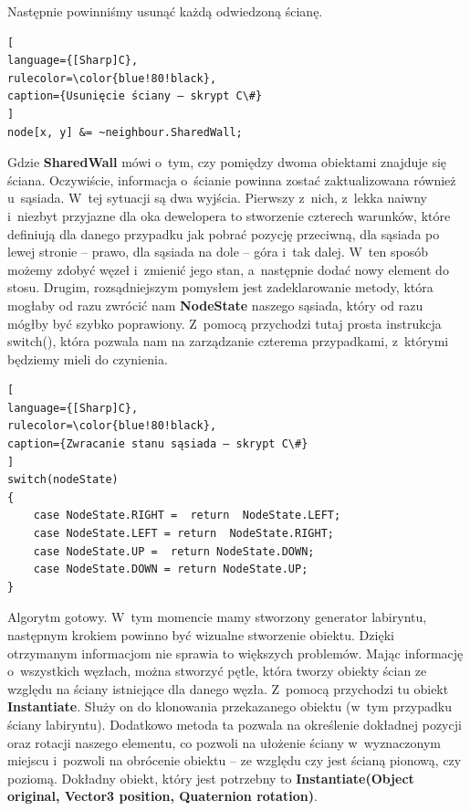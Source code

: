 \documentclass[oneside,polski,logo]{amuthesis}
\begin{document}
Następnie powinniśmy usunąć każdą odwiedzoną ścianę.

\begin{lstlisting}[
language={[Sharp]C},
rulecolor=\color{blue!80!black},
caption={Usunięcie ściany – skrypt C\#}
]
node[x, y] &= ~neighbour.SharedWall;
\end{lstlisting}

Gdzie \textbf{SharedWall} mówi o~tym, czy pomiędzy dwoma obiektami znajduje się ściana. Oczywiście, informacja o~ścianie powinna zostać zaktualizowana również u~sąsiada. W~tej sytuacji są dwa wyjścia. Pierwszy z~nich, z~lekka naiwny i~niezbyt przyjazne dla oka dewelopera to stworzenie czterech warunków, które definiują dla danego przypadku jak pobrać pozycję przeciwną, dla sąsiada po lewej stronie – prawo, dla sąsiada na dole – góra i~tak dalej. W~ten sposób możemy zdobyć węzeł i~zmienić jego stan, a~następnie dodać nowy element do stosu. Drugim, rozsądniejszym pomysłem jest zadeklarowanie metody, która mogłaby od razu zwrócić nam \textbf{NodeState} naszego sąsiada, który od razu mógłby być szybko poprawiony. Z~pomocą przychodzi tutaj prosta instrukcja switch(), która pozwala nam na zarządzanie czterema przypadkami, z~którymi będziemy mieli do czynienia.


\begin{lstlisting}[
language={[Sharp]C},
rulecolor=\color{blue!80!black},
caption={Zwracanie stanu sąsiada – skrypt C\#}
]
switch(nodeState)
{
	case NodeState.RIGHT =  return  NodeState.LEFT;
	case NodeState.LEFT = return  NodeState.RIGHT;
	case NodeState.UP =  return NodeState.DOWN;
	case NodeState.DOWN = return NodeState.UP;
}
\end{lstlisting}

Algorytm gotowy. W~tym momencie mamy stworzony generator labiryntu, następnym krokiem powinno być wizualne stworzenie obiektu. Dzięki otrzymanym informacjom nie sprawia to większych problemów. Mając informację o~wszystkich węzłach, można stworzyć pętle, która tworzy obiekty ścian ze względu na ściany istniejące dla danego węzła. Z~pomocą przychodzi tu obiekt \textbf{Instantiate}. Służy on do klonowania przekazanego obiektu (w~tym przypadku ściany labiryntu). Dodatkowo metoda ta pozwala na określenie dokładnej pozycji oraz rotacji naszego elementu, co pozwoli na ułożenie ściany w~wyznaczonym miejscu i~pozwoli na obrócenie obiektu – ze względu czy jest ścianą pionową, czy poziomą. Dokładny obiekt, który jest potrzebny to \textbf{Instantiate(Object original, Vector3 position, Quaternion rotation)}. \cite{Instantiate}
\end{document}
